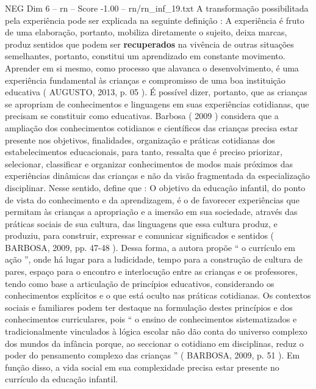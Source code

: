 \begin{textsample}{NEG Dim 6 – rn – Score -1.00 – rn/rn\_inf\_19.txt}
A transformação possibilitada pela experiência pode ser explicada na seguinte definição : A experiência é fruto de uma elaboração, portanto, mobiliza diretamente o sujeito, deixa marcas, produz sentidos que podem ser \textbf{recuperados} na vivência de outras situações semelhantes, portanto, constitui um aprendizado em constante movimento.
Aprender em si mesmo, como processo que alavanca o desenvolvimento, é uma experiência fundamental às crianças e compromisso de uma boa instituição educativa ( AUGUSTO, 2013, p. 05 ).
É possível dizer, portanto, que as crianças se apropriam de conhecimentos e linguagens em suas experiências cotidianas, que precisam se constituir como educativas.
Barbosa ( 2009 ) considera que a ampliação dos conhecimentos cotidianos e científicos das crianças precisa estar presente nos objetivos, finalidades, organização e práticas cotidianas dos estabelecimentos educacionais, para tanto, ressalta que é preciso priorizar, selecionar, classificar e organizar conhecimentos de modos mais próximos das experiências dinâmicas das crianças e não da visão fragmentada da especialização disciplinar.
Nesse sentido, define que : O objetivo da educação infantil, do ponto de vista do conhecimento e da aprendizagem, é o de favorecer experiências que permitam às crianças a apropriação e a imersão em sua sociedade, através das práticas sociais de sua cultura, das linguagens que essa cultura produz, e produziu, para construir, expressar e comunicar significados e sentidos ( BARBOSA, 2009, pp. 47-48 ).
Dessa forma, a autora propõe “ o currículo em ação ”, onde há lugar para a ludicidade, tempo para a construção de cultura de pares, espaço para o encontro e interlocução entre as crianças e os professores, tendo como base a articulação de princípios educativos, considerando os conhecimentos explícitos e o que está oculto nas práticas cotidianas.
Os contextos sociais e familiares podem ter destaque na formulação destes princípios e dos conhecimentos curriculares, pois “ o ensino de conhecimentos sistematizados e tradicionalmente vinculados à lógica escolar não dão conta do universo complexo dos mundos da infância porque, ao seccionar o cotidiano em disciplinas, reduz o poder do pensamento complexo das crianças ” ( BARBOSA, 2009, p. 51 ).
Em função disso, a vida social em sua complexidade precisa estar presente no currículo da educação infantil.

\end{textsample}
